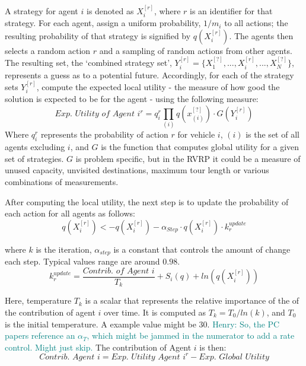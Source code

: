 \documentclass{sig-alternate}
\newcommand{\allcomments}[1]{{#1}}
\newcommand{\hfcomment}[1]{\textcolor{Teal}{\allcomments{Henry: {#1}}}}
\begin{document}
{A strategy for agent $i$ is denoted as $X_i^{[r]}$, where $r$ is an identifier for that strategy. For each agent, assign a uniform probability, $1/m_i$ to all actions; the resulting probability of that strategy is signified by $q(X_i^{[r]})$. The agents then selects a random action $r$ and a sampling of random actions from other agents. The resulting set, the `combined strategy set', $Y_i^{[r]}=\{X_1^{[?]}, ...,X_i^{[r]}, ...,X_N^{[?]}\}$, represents a guess as to a potential future. Accordingly, for each of the strategy sets $Y_i^{[r]}$, compute the expected local utility - the measure of how good the solution is expected to be for the agent - using the following measure:
	\begin{equation}
	\textit{Exp. Utility of Agent } i^r =q_i^r\prod_{(i)}{q(x_{(i)}^{[?]})\cdot G(Y_i^{[r]})}
	\end{equation}
Where $q_i^r$ represents the probability of action $r$ for vehicle $i$, $(i)$ is the set of all agents excluding $i$, and $G$ is the function that computes global utility for a given set of strategies. $G$ is problem specific, but in the RVRP it could be a measure of unused capacity, unvisited destinations, maximum tour length or various combinations of measurements.

After computing the local utility, the next step is to update the probability of each action for all agents as follows:
	\begin{equation}
	q(X_i^{[r]})<-q(X_i^{[r]})-\alpha_{Step}\cdot q(X_i^{[r]})\cdot k_r^{update}
	\end{equation}
	
where $k$ is the iteration, $\alpha_{step}$ is a constant that controls the amount of change each step. Typical values range are around $0.98$. 
	\begin{equation}
	k_r^{update} = \dfrac{\textit{Contrib. of Agent }i}{T_k}+S_i(q)+ln(q(X_i^{[r]}))
	\end{equation}
	
Here, temperature $T_k$ is a scalar that represents the relative importance of the of the contribution of agent $i$ over time. It is computed as $T_k=T_0/ln(k)$, and $T_0$ is the initial temperature. A example value might be $30$.
\hfcomment{So, the PC papers reference an $\alpha_{T}$, which might be jammed in the numerator to add a rate control. Might just skip.}
The contribution of Agent $i$ is then:
	\begin{equation}
	\textit{Contrib. Agent }i = \textit{Exp. Utility Agent }i^r - \textit{Exp. Global Utility}
	\end{equation}
	
}
\end{document}
